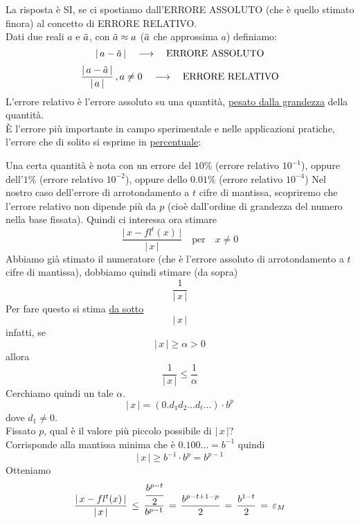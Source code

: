 La risposta è SI, se ci spostiamo dall'ERRORE ASSOLUTO (che è quello stimato finora) al concetto di ERRORE RELATIVO. \\
Dati due reali $a$ e $\Tilde{a}$, con $\Tilde{a} \approx a$ ($\Tilde{a}$ che approssima $a$) definiamo:
\[ \lvert \, a - \Tilde{a} \, \rvert \quad \longrightarrow \quad \text{ERRORE ASSOLUTO}\]
\[ \frac{\lvert \, a - \Tilde{a} \, \rvert}{\lvert \, a \, \rvert} \, , a \ne 0 \quad \longrightarrow \quad \text{ERRORE RELATIVO} \]
L'errore relativo è l'errore assoluto su una quantità, \uline{pesato dalla grandezza} della quantità. \\
È l'errore più importante in campo sperimentale e nelle applicazioni pratiche, l'errore che di solito si esprime in \uline{percentuale}:
\begin{esempio} \end{esempio}
Una certa quantità è nota con un errore del $10\%$ (errore relativo $10^{-1}$), oppure dell'$1\%$ (errore relativo $10^{-2}$), oppure dello $0.01\%$ (errore relativo $10^{-4}$)
\newline \newline
Nel nostro caso dell'errore di arrotondamento a $t$ cifre di mantissa, scopriremo che l'errore relativo non dipende più da $p$ (cioè dall'ordine di grandezza del numero nella base fissata). Quindi ci interessa ora stimare
\[ \frac{\lvert \, x - fl^t(x) \, \rvert}{\lvert \, x \, \rvert} \quad \text{per}\quad x \ne 0 \]
Abbiamo già stimato il numeratore (che è l'errore assoluto di arrotondamento a $t$ cifre di mantissa), dobbiamo quindi stimare (da sopra) \[ \frac{1}{\lvert \, x  \, \rvert} \]
Per fare questo si stima \uline{da sotto} \[ \lvert \, x \, \rvert \]
infatti, se \[ \lvert \, x \, \rvert \ge \alpha > 0 \] allora 
\[ \frac{1}{\lvert \, x \, \rvert} \le \frac{1}{\alpha} \]
Cerchiamo quindi un tale $\alpha$.
\[ \lvert \, x \, \rvert = (0.d_1 d_2 \dotsc d_t \dotsc ) \cdot b^p \] dove $d_1 \ne 0$. \\
Fissato $p$, qual è il valore più piccolo possibile di $\lvert \, x \, \rvert$? \\
Corrisponde alla mantissa minima che è $0.100 \dotsc = b^{-1}$ quindi
\[ \lvert \, x \, \rvert \ge b^{-1} \cdot b^p = b^{p-1} \] Otteniamo
\[ \frac{\lvert \, x - fl^t(x) \, \rvert}{\lvert \, x \, \rvert} \, \le \, \frac{\cfrac{b^{p-t}}{2}}{b^{p-1}} \,=\, \frac{b^{p-t+1-p}}{2} \,=\, \frac{b^{1-t}}{2} \,=\, \varepsilon_M\]

